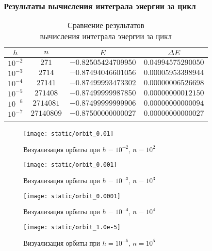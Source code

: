 \begin{frame}
\frametitle{Результаты вычисления интеграла энергии за цикл}

\begin{table}[h]
  \centering
  \caption{Сравнение результатов \\ вычисления интеграла энергии за цикл}
  \begin{tabular}{cccc}
    \toprule
    $ h $ &
    $ n $ &
    $ E $ &
    $ \Delta E $ \\
    \midrule
    $ 10^{-2} $ & $ 271 $ & $ -0.82505424709950 $ & $ 0.04994575290050 $ \\
    \arrayrulecolor{black!40}
    \midrule
    $ 10^{-3} $ & $ 2714 $ & $ -0.87494046601056 $ & $ 0.00005953398944 $ \\
    \midrule
    $ 10^{-4} $ & $ 27141 $ & $ -0.87499993473302 $ & $ 0.00000006526698 $ \\
    \midrule
    $ 10^{-5} $ & $ 271408 $ & $ -0.87499999987850 $ & $ 0.00000000012150 $ \\
    \midrule
    $ 10^{-6} $ & $ 2714081 $ & $ -0.87499999999906 $ & $ 0.00000000000094 $ \\
    \midrule
    $ 10^{-7} $ & $ 27140809 $ & $ -0.87500000000027 $ & $ 0.00000000000027 $ \\
    \arrayrulecolor{black}
    \bottomrule
  \end{tabular}
\end{table}

\end{frame}

\begin{frame}
\begin{figure}[h]
  \centering
  \texttt{[image: static/orbit\_0.01]}
  \caption{Визуализация орбиты при $ h = 10^{-2} $, $ n = 10^2 $}
\end{figure}
\end{frame}

\begin{frame}
\begin{figure}[h]
  \centering
  \texttt{[image: static/orbit\_0.001]}
  \caption{Визуализация орбиты при $ h = 10^{-3} $, $ n = 10^3 $}
\end{figure}
\end{frame}

\begin{frame}
\begin{figure}[h]
  \centering
  \texttt{[image: static/orbit\_0.0001]}
  \caption{Визуализация орбиты при $ h = 10^{-4} $, $ n = 10^4 $}
\end{figure}
\end{frame}

\begin{frame}
\begin{figure}[h]
  \centering
  \texttt{[image: static/orbit\_1.0e-5]}
  \caption{Визуализация орбиты при $ h = 10^{-5} $, $ n = 10^5 $}
\end{figure}
\end{frame}


